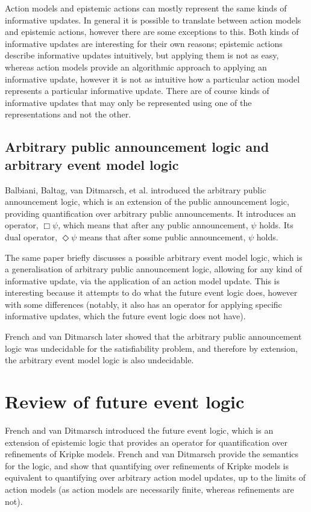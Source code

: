 Action models and epistemic actions can mostly represent the same kinds of
informative updates. In general it is possible to translate between action
models and epistemic actions, however there are some exceptions to this. Both
kinds of informative updates are interesting for their own reasons; epistemic
actions describe informative updates intuitively, but applying them is not as
easy, whereas action models provide an algorithmic approach to applying an
informative update, however it is not as intuitive how a particular action model
represents a particular informative update. There are of course kinds of
informative updates that may only be represented using one of the
representations and not the other.

\subsection*{Arbitrary public announcement logic and arbitrary event model
logic}

Balbiani, Baltag, van Ditmarsch, et al.\cite{balbiani2007arbitrary} introduced
the arbitrary public announcement logic, which is an extension of the public
announcement logic, providing quantification over arbitrary public
announcements. It introduces an operator, $\Box\psi$, which means that after any
public announcement, $\psi$ holds. Its dual operator, $\Diamond\psi$ means that
after some public announcement, $\psi$ holds.

The same paper briefly discusses a possible arbitrary event model logic, which
is a generalisation of arbitrary public announcement logic, allowing for any
kind of informative update, via the application of an action model update. This
is interesting because it attempts to do what the future event logic does,
however with some differences (notably, it also has an operator for applying
specific informative updates, which the future event logic does not have).

French and van Ditmarsch\cite{french2008undecidability} later showed that the
arbitrary public announcement logic was undecidable for the satisfiability
problem, and therefore by extension, the arbitrary event model logic is also
undecidable.

\section{Review of future event logic}

French and van Ditmarsch\cite{french2009simulation} introduced the future event
logic, which is an extension of epistemic logic that provides an operator for
quantification over refinements of Kripke models. French and van Ditmarsch
provide the semantics for the logic, and show that quantifying over refinements
of Kripke models is equivalent to quantifying over arbitrary action model
updates, up to the limits of action models (as action models are necessarily
finite, whereas refinements are not).

